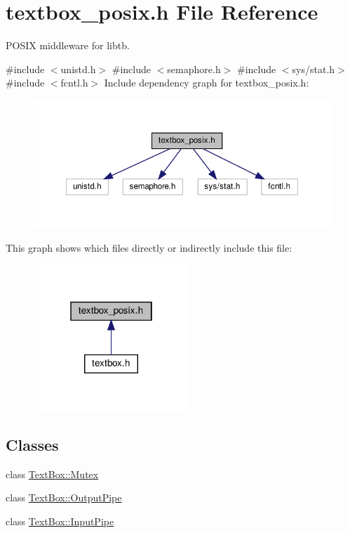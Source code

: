 \hypertarget{a00008}{}\section{textbox\+\_\+posix.\+h File Reference}
\label{a00008}


P\+O\+S\+IX middleware for libtb.  


{\ttfamily \#include $<$unistd.\+h$>$}\newline
{\ttfamily \#include $<$semaphore.\+h$>$}\newline
{\ttfamily \#include $<$sys/stat.\+h$>$}\newline
{\ttfamily \#include $<$fcntl.\+h$>$}\newline
Include dependency graph for textbox\+\_\+posix.\+h\+:\nopagebreak
\begin{figure}[H]
\begin{center}
\leavevmode
\includegraphics[width=350pt]{a00009}
\end{center}
\end{figure}
This graph shows which files directly or indirectly include this file\+:\nopagebreak
\begin{figure}[H]
\begin{center}
\leavevmode
\includegraphics[width=166pt]{a00010}
\end{center}
\end{figure}
\subsection*{Classes}
\begin{DoxyCompactItemize}
\item 
class \hyperlink{a00036}{Text\+Box\+::\+Mutex}
\item 
class \hyperlink{a00040}{Text\+Box\+::\+Output\+Pipe}
\item 
class \hyperlink{a00044}{Text\+Box\+::\+Input\+Pipe}
\end{DoxyCompactItemize}
